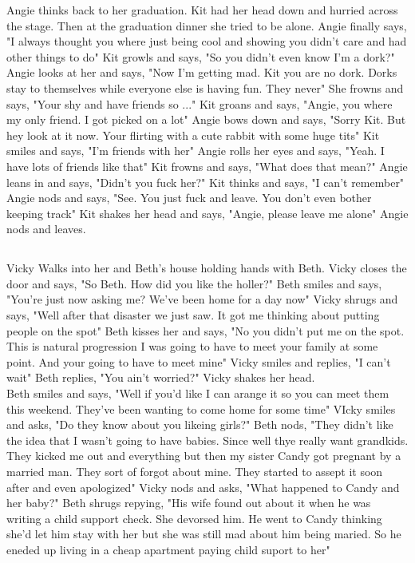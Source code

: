 \documentclass{article}[12px] %
\begin{document}
Angie thinks back to her graduation. Kit had her head down and hurried across the stage. Then at the graduation dinner she tried to be alone. Angie finally says, "I always thought you where just being cool and showing you didn't care and had other things to do" Kit growls and says, "So you didn't even know I'm a dork?" Angie looks at her and says, "Now I'm getting mad. Kit you are no dork. Dorks stay to themselves while everyone else is having fun. They never" She frowns and says, "Your shy and have friends so ..." Kit groans and says, "Angie, you where my only friend. I got picked on a lot" Angie bows down and says, "Sorry Kit. But hey look at it now. Your flirting with a cute rabbit with some huge tits" Kit smiles and says, "I'm friends with her" Angie rolls her eyes and says, "Yeah. I have lots of friends like that" Kit frowns and says, "What does that mean?" Angie leans in and says, "Didn't you fuck her?" Kit thinks and says, "I can't remember" Angie nods and says, "See. You just fuck and leave. You don't even bother keeping track" Kit shakes her head and says, "Angie, please leave me alone" Angie nods and leaves.

\subsection{  }
Vicky Walks into  her and Beth's house holding hands with Beth. Vicky closes the door and says, "So Beth. How did you like the holler?" Beth smiles and says, "You're just now asking me? We've been home for a day now" Vicky shrugs and says, "Well after that disaster we just saw. It got me thinking about putting people on the spot" Beth kisses her and says, "No you didn't put me on the spot. This is natural progression I was going to have to meet your family at some point. And your going to have to meet mine" Vicky smiles and replies, "I can't wait" Beth replies, "You ain't worried?" Vicky shakes her head.\\
 
Beth smiles and says, "Well if you'd like I can arange it so you can meet them this weekend. They've been wanting to come home for some time" VIcky smiles and asks, "Do they know about you likeing girls?" Beth nods, "They didn't like the idea that I wasn't going to have babies. Since well thye really want grandkids. They kicked me out and everything but then my sister Candy got pregnant by a married man. They sort of forgot about mine. They started to assept it soon after and even apologized" Vicky nods and asks, "What happened to Candy and her baby?" Beth shrugs repying, "His wife found out about it when he was writing a child support check. She devorsed him. He went to Candy thinking she'd let him stay with her but she was still mad about him being maried. So he eneded up living in a cheap apartment paying child suport to her"
\end{document}
